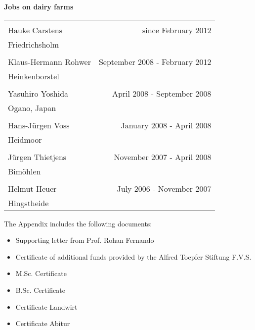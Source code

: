 \documentclass[a4paper,DIVcalc,12pt,liststotoc,headsepline,plainheadsepline]{scrartcl}
\begin{document}
\textbf{\large{Jobs on dairy farms}}

\begin{tabularx}{\textwidth}{lR}
 &  \\ 
Hauke Carstens  & since February 2012 \\ 
Friedrichsholm  &  \\ 
 &  \\ 
Klaus-Hermann Rohwer & September 2008 - February 2012 \\ 
Heinkenborstel &  \\
 &  \\ 

Yasuhiro Yoshida  & April 2008 - September 2008 \\ 
Ogano, Japan &  \\ 
 &  \\ 
Hans-Jürgen Voss & January 2008 - April 2008  \\ 
Heidmoor &  \\
 &  \\ 
Jürgen Thietjens & November 2007 - April 2008  \\ 
Bimöhlen &  \\
 &  \\ 
Helmut Heuer & July 2006 - November 2007  \\ 
Hingstheide & \\
\end{tabularx} 



\clearpage
{}
The Appendix includes the following documents:

\begin{itemize}
\item Supporting letter from Prof. Rohan Fernando
\item Certificate of additional funds provided by the Alfred Toepfer Stiftung F.V.S.
\item M.Sc. Certificate
\item B.Sc. Certificate
\item Certificate Landwirt
\item Certificate Abitur
\end{itemize}
\clearpage
%
%
%
%
%
%
\end{document}
